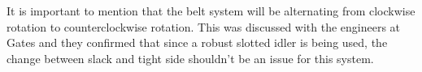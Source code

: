 It is important to mention that the belt system will be alternating from clockwise rotation to counterclockwise rotation. This was discussed with the engineers at Gates and they confirmed that since a robust slotted idler is being used, the change between slack and tight side shouldn’t be an issue for this system.